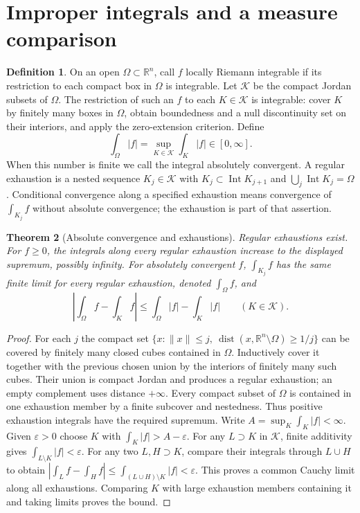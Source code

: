 \documentclass[11pt,oneside,openany]{book}
\newtheorem{theorem}{Theorem}[chapter]
\theoremstyle{definition}
\newtheorem{definition}[theorem]{Definition}
\theoremstyle{remark}
\newcommand{\R}{\mathbb R}
\newcommand{\eps}{\varepsilon}
\newcommand{\norm}[1]{\lVert#1\rVert}
\DeclareMathOperator{\dist}{dist}
\DeclareMathOperator{\Int}{Int}
\newcommand{\family}[1]{}
\begin{document}
\section{Improper integrals and a measure comparison}
\family{K04.06.13}
\begin{definition}\label{d04:06:improper-definition}
On an open $\Omega\subset\R^n$, call $f$ locally Riemann integrable if its restriction to each compact box in $\Omega$ is integrable. Let $\mathcal K$ be the compact Jordan subsets of $\Omega$. The restriction of such an $f$ to each $K\in\mathcal K$ is integrable: cover $K$ by finitely many boxes in $\Omega$, obtain boundedness and a null discontinuity set on their interiors, and apply the zero-extension criterion. Define
\[
 \int_\Omega |f|=\sup_{K\in\mathcal K}\int_K|f|\in[0,\infty].
\]
When this number is finite we call the integral absolutely convergent. A regular exhaustion is a nested sequence $K_j\in\mathcal K$ with $K_j\subset\Int K_{j+1}$ and $\bigcup_j\Int K_j=\Omega$. Conditional convergence along a specified exhaustion means convergence of $\int_{K_j}f$ without absolute convergence; the exhaustion is part of that assertion.
\end{definition}

\begin{theorem}[Absolute convergence and exhaustions]\label{d04:06:absolute-exhaustion}
Regular exhaustions exist. For $f\geq0$, the integrals along every regular exhaustion increase to the displayed supremum, possibly infinity. For absolutely convergent $f$, $\int_{K_j}f$ has the same finite limit for every regular exhaustion, denoted $\int_\Omega f$, and
\[
 \left|\int_\Omega f-\int_K f\right|\leq
 \int_\Omega|f|-\int_K|f|\qquad(K\in\mathcal K).
\]
\end{theorem}
\begin{proof}
For each $j$ the compact set $\{x:\norm x\leq j,\ \dist(x,\R^n\setminus\Omega)\geq1/j\}$ can be covered by finitely many closed cubes contained in $\Omega$. Inductively cover it together with the previous chosen union by the interiors of finitely many such cubes. Their union is compact Jordan and produces a regular exhaustion; an empty complement uses distance $+\infty$. Every compact subset of $\Omega$ is contained in one exhaustion member by a finite subcover and nestedness. Thus positive exhaustion integrals have the required supremum.
Write $A=\sup_K\int_K|f|<\infty$. Given $\eps>0$ choose $K$ with $\int_K|f|>A-\eps$. For any $L\supset K$ in $\mathcal K$, finite additivity gives $\int_{L\setminus K}|f|<\eps$. For any two $L,H\supset K$, compare their integrals through $L\cup H$ to obtain $|\int_Lf-\int_Hf|\leq\int_{(L\cup H)\setminus K}|f|<\eps$. This proves a common Cauchy limit along all exhaustions. Comparing $K$ with large exhaustion members containing it and taking limits proves the bound.
\end{proof}
\end{document}
